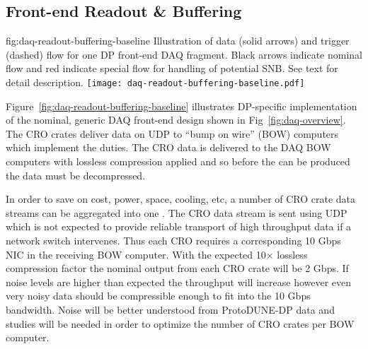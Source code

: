 \subsection{Front-end Readout \& Buffering}
\label{sec:fd-daq-fero}


\begin{dunefigure}{fig:daq-readout-buffering-baseline}
  {Illustration of data (solid arrows) and trigger (dashed) flow for
    one DP front-end DAQ fragment. 
    Black arrows indicate nominal flow and red indicate special flow
    for handling of potential SNB.  See text for detail description.}
  \texttt{[image: daq-readout-buffering-baseline.pdf]}%
\end{dunefigure}

Figure~\ref{fig:daq-readout-buffering-baseline} illustrates
DP-specific implementation of the nominal, generic DAQ front-end
 design shown in Fig~\ref{fig:daq-overview}. 
The CRO crates deliver data on UDP to ``bump on wire'' (BOW) computers
which implement the  duties.
The CRO data is delivered to the DAQ BOW computers with lossless
compression applied and so before the  can be
produced the data must be decompressed. 

In order to save on cost, power, space, cooling, etc, a number of CRO
crate data streams can be aggregated into one . 
The CRO data stream is sent using UDP which is not expected to provide
reliable transport of high throughput data if a network switch
intervenes. 
Thus each CRO requires a corresponding 10 Gbps NIC in the receiving
BOW computer.
With the expected 10$\times$ lossless compression factor the nominal
output from each CRO crate will be 2 Gbps. 
If noise levels are higher than expected the throughput will increase
however even very noisy data should be compressible enough to fit into
the 10 Gbps bandwidth. 
Noise will be better understood from ProtoDUNE-DP data and studies
will be needed in order to optimize the number of CRO crates per BOW
computer.

